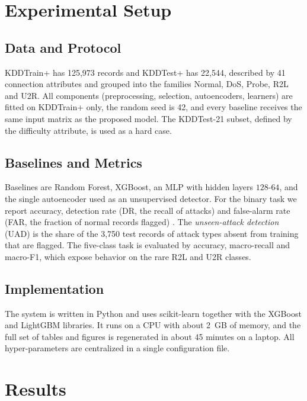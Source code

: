 \documentclass[journal]{IEEEtran}
\begin{document}
\section{Experimental Setup}
\label{sec:setup}
\subsection{Data and Protocol}
KDDTrain+ has 125{,}973 records and KDDTest+ has 22{,}544, described by 41 connection attributes and grouped into the families Normal, DoS, Probe, R2L and U2R. All components (preprocessing, selection, autoencoders, learners) are fitted on KDDTrain+ only, the random seed is 42, and every baseline receives the same input matrix as the proposed model. The KDDTest-21 subset, defined by the difficulty attribute, is used as a hard case.

\subsection{Baselines and Metrics}
Baselines are Random Forest, XGBoost, an MLP with hidden layers $128\text{-}64$, and the single autoencoder used as an unsupervised detector. For the binary task we report accuracy, detection rate (DR, the recall of attacks) and false-alarm rate (FAR, the fraction of normal records flagged) \cite{powers2011}. The \emph{unseen-attack detection} (UAD) is the share of the 3{,}750 test records of attack types absent from training that are flagged. The five-class task is evaluated by accuracy, macro-recall and macro-F1, which expose behavior on the rare R2L and U2R classes.

\subsection{Implementation}
The system is written in Python and uses scikit-learn \cite{pedregosa2011} together with the XGBoost and LightGBM libraries. It runs on a CPU with about 2~GB of memory, and the full set of tables and figures is regenerated in about 45 minutes on a laptop. All hyper-parameters are centralized in a single configuration file.

\section{Results}
\label{sec:results}
\end{document}
